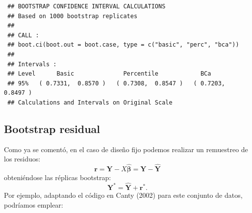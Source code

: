 \documentclass[
  10pt,
]{book}
\newenvironment{Shaded}{\begin{snugshade}}{\end{snugshade}}
\newcommand{\AttributeTok}[1]{\textcolor[rgb]{0.77,0.63,0.00}{#1}}
\newcommand{\ControlFlowTok}[1]{\textcolor[rgb]{0.13,0.29,0.53}{\textbf{#1}}}
\newcommand{\DecValTok}[1]{\textcolor[rgb]{0.00,0.00,0.81}{#1}}
\newcommand{\FunctionTok}[1]{\textcolor[rgb]{0.00,0.00,0.00}{#1}}
\newcommand{\NormalTok}[1]{#1}
\newcommand{\OtherTok}[1]{\textcolor[rgb]{0.56,0.35,0.01}{#1}}
\newcommand{\SpecialCharTok}[1]{\textcolor[rgb]{0.00,0.00,0.00}{#1}}
\renewcommand{\mathbf}[1]{\symbf{#1}}
\theoremstyle{break}
\theoremstyle{nonumberplain}
\begin{document}
\begin{verbatim}
 ## BOOTSTRAP CONFIDENCE INTERVAL CALCULATIONS
 ## Based on 1000 bootstrap replicates
 ## 
 ## CALL : 
 ## boot.ci(boot.out = boot.case, type = c("basic", "perc", "bca"))
 ## 
 ## Intervals : 
 ## Level      Basic              Percentile            BCa          
 ## 95%   ( 0.7331,  0.8570 )   ( 0.7308,  0.8547 )   ( 0.7203,  0.8497 )  
 ## Calculations and Intervals on Original Scale
\end{verbatim}

\hypertarget{boot-residual}{%
\subsection{Bootstrap residual}\label{boot-residual}}

Como ya se comentó, en el caso de diseño fijo podemos realizar un remuestreo de los residuos:
\[\mathbf{r} = \mathbf{Y} - X\hat{\mathbf{\beta}} = \mathbf{Y} - \hat{\mathbf{Y}}\]
obteniéndose las réplicas bootstrap:
\[\mathbf{Y}^{\ast} = \hat{\mathbf{Y}} + \mathbf{r}^{\ast}.\]
Por ejemplo, adaptando el código en Canty (2002) para este conjunto de datos, podríamos emplear:

\begin{Shaded}
\end{Shaded}
\end{document}
